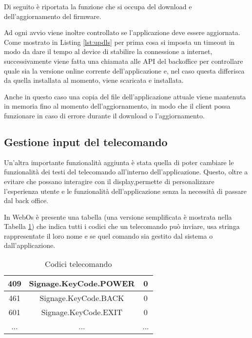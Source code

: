 Di seguito è riportata la funzione che si occupa del download e dell'aggiornamento del firmware.



Ad ogni avvio viene inoltre controllato se l'applicazione deve essere aggiornata.
Come mostrato in Listing \ref*{lst:updls} per prima cosa si imposta un timeout in modo da dare il tempo al device di stabilire la connessione a internet, successivamente viene fatta una chiamata alle API del backoffice per controllare quale sia la versione online corrente dell'applicazione e, nel caso questa differisca da quella installata al momento, viene scaricata e installata.



Anche in questo caso una copia del file dell'applicazione attuale viene mantenuta in memoria fino al momento dell'aggiornamento, in modo che il client possa funzionare in caso di errore durante il download o l'aggiornamento.

\subsection{Gestione input del telecomando}

Un'altra importante funzionalità aggiunta è stata quella di poter cambiare le funzionalità dei testi del telecomando all'interno dell'applicazione.
Questo, oltre a evitare che  possano interagire con il display,permette di personalizzare l'esperienza utente e le funzionalità dell'applicazione senza la necessità di passare dal back office.

In WebOs è presente una tabella (una versione semplificata è mostrata nella Tabella \ref*{tab:keycode}) che indica tutti i codici che un telecomando può inviare, usa stringa rappresentate il loro nome e se quel comando sia gestito dal sistema o dall'applicazione.

\begin{table}
    \centering
    \begin{tabular}{ |c|c|c| } 
         \hline
         409 & Signage.KeyCode.POWER & 0 \\  
         \hline
         461 & Signage.KeyCode.BACK & 0 \\  
         \hline
         601 & Signage.KeyCode.EXIT & 0 \\  
         \hline
         ... & ... & ...\\
         \hline
    \end{tabular}
    \caption{Codici telecomando} \label{tab:keycode}
\end{table}
    
